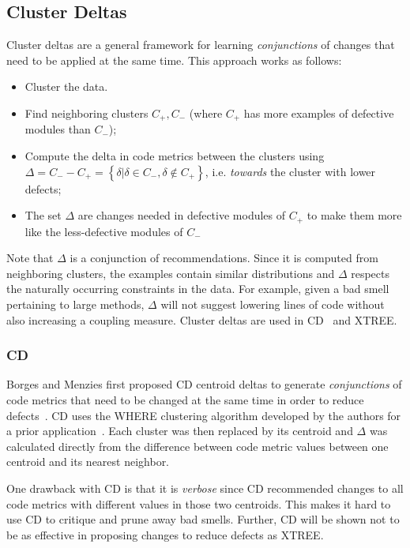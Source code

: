 \documentclass[twocolumn,5p]{elsarticle}
\theoremstyle{break}
\begin{document}
	
	\subsection{Cluster Deltas}
	
	Cluster deltas are a general framework
	for learning {\em conjunctions} of changes
	that need to be applied at the same time.
	This approach works as follows:
	\begin{itemize}
		\item Cluster the data.
		\item Find
		neighboring clusters $C_+,C_-$ (where $C_+$ has more examples of 
		defective
		modules than $C_-$);
		\item Compute the  delta   in code metrics between the clusters using 
		\mbox{$\Delta = C_- - C_+ = \left\{\delta|\delta\in C_-, \delta \notin 
		C_+\right\}$}, i.e.
		{\em towards} the cluster with lower defects;
		\item The set $\Delta$ are changes needed in defective modules of $C_+$ 
		to
		make them more like the less-defective modules of $C_-$
	\end{itemize}
	Note that $\Delta$ is a conjunction of  recommendations.
	Since it is computed
	from neighboring clusters, the examples contain similar distributions and 
	$\Delta$ respects the naturally occurring constraints in the data. For 
	example,
	given a bad smell pertaining to large methods,   $\Delta$   will not  
	suggest lowering lines of code
	without also increasing a coupling measure.
	Cluster deltas are used in CD~\cite{me12c} and XTREE.
	
	
	
	\subsubsection{CD}\label{sect:cdcd}
	Borges and Menzies first proposed CD centroid deltas to
	generate {\em conjunctions} of code metrics
	that need to be changed at the same time
	in order to reduce defects~\cite{me12c}.
	CD uses the WHERE clustering algorithm developed by the
	authors for a prior application~\cite{me12d}.
	Each cluster was then replaced by its centroid
	and $\Delta$ was calculated directly from the difference
	between code metric values between one centroid
	and its nearest neighbor.
	
	
	One drawback with CD is that it is {\em verbose}
	since
	CD   recommended changes to all code
	metrics with different values in those two centroids.
	This makes it hard to use CD to   critique and prune away bad smells. 
	Further, CD will be shown not to be as effective
	in proposing changes to reduce defects as XTREE.
	
\end{document}
